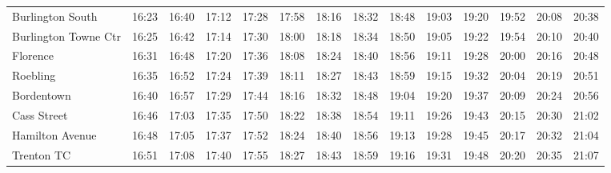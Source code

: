\begin{center}
\begin{tabular}{@{}lrrrrrrrrrrrrr@{}}
Burlington South & 16:23 & 16:40 & 17:12 & 17:28 & 17:58 & 18:16 & 18:32 & 18:48 & 19:03 & 19:20 & 19:52 & 20:08 & 20:38 \\
Burlington Towne Ctr & 16:25 & 16:42 & 17:14 & 17:30 & 18:00 & 18:18 & 18:34 & 18:50 & 19:05 & 19:22 & 19:54 & 20:10 & 20:40 \\
Florence & 16:31 & 16:48 & 17:20 & 17:36 & 18:08 & 18:24 & 18:40 & 18:56 & 19:11 & 19:28 & 20:00 & 20:16 & 20:48 \\
Roebling & 16:35 & 16:52 & 17:24 & 17:39 & 18:11 & 18:27 & 18:43 & 18:59 & 19:15 & 19:32 & 20:04 & 20:19 & 20:51 \\
Bordentown & 16:40 & 16:57 & 17:29 & 17:44 & 18:16 & 18:32 & 18:48 & 19:04 & 19:20 & 19:37 & 20:09 & 20:24 & 20:56 \\
Cass Street & 16:46 & 17:03 & 17:35 & 17:50 & 18:22 & 18:38 & 18:54 & 19:11 & 19:26 & 19:43 & 20:15 & 20:30 & 21:02 \\
Hamilton Avenue & 16:48 & 17:05 & 17:37 & 17:52 & 18:24 & 18:40 & 18:56 & 19:13 & 19:28 & 19:45 & 20:17 & 20:32 & 21:04 \\
Trenton TC & 16:51 & 17:08 & 17:40 & 17:55 & 18:27 & 18:43 & 18:59 & 19:16 & 19:31 & 19:48 & 20:20 & 20:35 & 21:07 \\
\bottomrule\end{tabular}\end{center}
